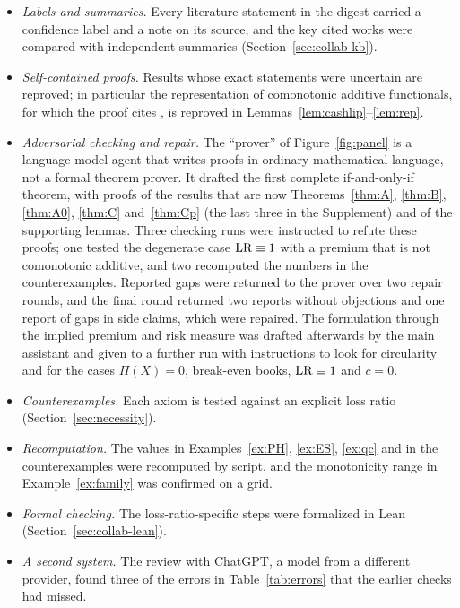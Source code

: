 \begin{itemize}[nosep]
\item \emph{Labels and summaries.} Every literature statement in the digest carried a confidence label and a note on
  its source, and the key cited works were compared with independent summaries (Section~\ref{sec:collab-kb}).
\item \emph{Self-contained proofs.} Results whose exact statements were uncertain are reproved; in particular the
  representation of comonotonic additive functionals, for which the proof cites \citet[Thm.~1]{www2020}, is
  reproved in Lemmas~\ref{lem:cashlip}--\ref{lem:rep}.
\item \emph{Adversarial checking and repair.} The ``prover'' of Figure~\ref{fig:panel} is a language-model agent that
  writes proofs in ordinary mathematical language, not a formal theorem prover. It drafted the first complete
  if-and-only-if theorem, with proofs of the results that are now Theorems~\ref{thm:A}, \ref{thm:B}, \ref{thm:A0},
  \ref{thm:C} and~\ref{thm:Cp} (the last three in the Supplement) and of the supporting lemmas. Three checking runs were instructed to refute these
  proofs; one tested the degenerate case $\mathrm{LR}\equiv1$ with a premium that is not comonotonic additive, and two
  recomputed the numbers in the counterexamples. Reported gaps were returned to the prover over two repair rounds,
  and the final round returned two reports without objections and one report of gaps in side claims, which were
  repaired. The formulation through the implied premium and risk measure was drafted afterwards by the main
  assistant and given to a further run with instructions to look for circularity and for the cases $\Pi(X)=0$,
  break-even books, $\mathrm{LR}\equiv1$ and $c=0$.
\item \emph{Counterexamples.} Each axiom is tested against an explicit loss ratio
  (Section~\ref{sec:necessity}).
\item \emph{Recomputation.} The values in Examples~\ref{ex:PH}, \ref{ex:ES}, \ref{ex:qc} and in the counterexamples
  were recomputed by script, and the monotonicity range in Example~\ref{ex:family} was confirmed on a grid.
\item \emph{Formal checking.} The loss-ratio-specific steps were formalized in Lean
  (Section~\ref{sec:collab-lean}).
\item \emph{A second system.} The review with ChatGPT, a model from a different provider, found three of the errors in
  Table~\ref{tab:errors} that the earlier checks had missed.
\end{itemize}

